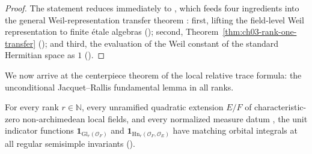 \begin{proof}
The statement reduces immediately to
, which feeds four
ingredients into the general Weil-representation transfer theorem
:
first, lifting the field-level Weil representation to finite \'etale algebras
(); second,
Theorem~\ref{thm:ch03-rank-one-transfer}
(); and third,
the evaluation of the Weil constant of the standard Hermitian space as $1$
().
\end{proof}

We now arrive at the centerpiece theorem of the local relative trace formula:
the unconditional Jacquet--Rallis fundamental lemma in all ranks.

\begin{theorem}
\label{thm:ch03-jr-unit-match-all}
For every rank $r \in \mathbb{N}$, every unramified quadratic extension $E/F$
of characteristic-zero non-archimedean local fields, and every normalized
measure datum , the unit indicator functions
$\mathbf{1}_{\mathrm{Gl}_r(\mathcal{O}_F)}$ and
$\mathbf{1}_{\mathrm{Hn}_r(\mathcal{O}_F, \mathcal{O}_E)}$ have matching
orbital integrals at all regular semisimple invariants
().
\end{theorem}

